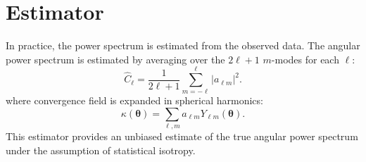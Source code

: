\section{Estimator}
In practice, the power spectrum is estimated from the observed data. The angular power spectrum is estimated by averaging over the $2\ell + 1$ $m$-modes for each $\ell$:
\begin{equation}
    \hat{C}_\ell = \frac{1}{2\ell + 1} \sum_{m=-\ell}^{\ell} |a_{\ell m}|^2.
\end{equation}
where convergence field is expanded in spherical harmonics:
\begin{equation}
    \kappa(\boldsymbol{\theta}) = \sum_{\ell, m} a_{\ell m} Y_{\ell m}(\boldsymbol{\theta}).
    \label{eq:kappa_expansion}
\end{equation}
This estimator provides an unbiased estimate of the true angular power spectrum under the assumption of statistical isotropy.


